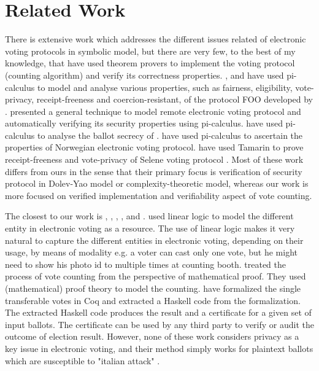 \section{Related Work}
 There is extensive work which 
 addresses the different issues related of electronic voting protocols  in symbolic model, 
 but there are very few, to the best of my knowledge, 
 that have used theorem provers to implement the voting protocol (counting algorithm)
 and verify its correctness properties. 
 \citep{10.1007/978-3-540-31987-0_14}, and  \citep{Delaune2010} have used pi-calculus to model 
 and analyse various properties, such as fairness, eligibility, vote-privacy, receipt-freeness and 
 coercion-resistant,  
 of the protocol FOO developed by \citep{10.1007/3-540-57220-1_66}.  \citep{Backes:2008:AVR:1380848.1381255}
 presented a general technique to model  remote electronic 
 voting protocol and automatically verifying  its security properties using pi-calculus. 
 \citep{5992139} have used pi-calculus to analyse the ballot secrecy of \citep{Helios:2016:HVS}.
 \citep{10.1007/978-3-642-28641-4_7} have used pi-calculus to ascertain the properties of 
 Norwegian electronic voting protocol.
 \citep{10.1007/978-3-319-68687-5_7} have used Tamarin  to prove receipt-freeness 
 and vote-privacy of Selene voting protocol \citep{Selene}.  Most of these work differs from ours
 in the sense that their primary focus is verification of security protocol in  
 Dolev-Yao model or  complexity-theoretic model, whereas our work is 
 more focused on verified implementation and  verifiability  aspect of vote counting.

 The closest to our work is \citep{DeYoung:2012:LLV}, \citep{Pattinson:2015:VCM}, \citep{Pattinson:2016:MSP},
 \citep{Verity:2017:FVI:3014812.3014845}, and \citep{Ghale:2017:FVS}.  \citep{DeYoung:2012:LLV} 
 used linear logic\citep{GIRARD19871} to model the different entity in electronic voting as a resource. 
 The use of linear logic makes it very natural to capture the different entities in electronic voting,  
 depending on their usage, by means of modality e.g. a voter can cast only one vote, but he might 
 need to show his photo id to multiple times at counting booth. \citep{Pattinson:2015:VCM} treated 
 the process of vote counting from
 the perspective of mathematical proof. They used (mathematical) proof theory to model the 
 counting. \citep{Ghale:2017:FVS} have formalized the single transferable votes in Coq and 
 extracted a Haskell code from the formalization. The extracted Haskell code produces the result 
 and a certificate for a given set of input ballots. The certificate can be used by any third party to verify 
 or audit the outcome of election result.  However, none of these work considers privacy as a key 
 issue in electronic voting, and their method simply works for plaintext ballots which are  susceptible to 
 "italian attack"  \citep{Otten}   \citep{Benaloh:2009:SSC}.

